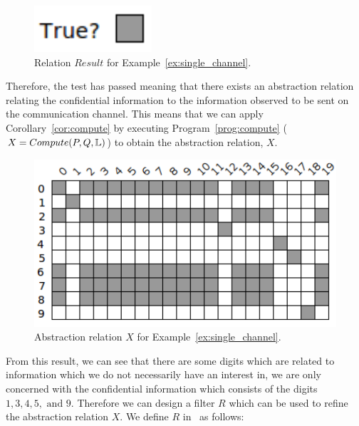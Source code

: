 \begin{example}
	\begin{figure}[ht]
		\centering
		\includegraphics[scale=0.65]{Figures/PDF/Relview/True.pdf}
		\caption{Relation $Result$ for Example~\ref{ex:single_channel}.}
		\label{fig:single_channel_result}
	\end{figure}

	Therefore, the test has passed meaning that there exists an abstraction relation relating the confidential information to the information observed to be sent on the communication channel. This means that we can apply Corollary~\ref{cor:compute} by executing Program~\ref{prog:compute} ($X = Compute(P,Q,\mathbb{L})$) to obtain the abstraction relation, $X$. \newline

	\begin{figure}[ht]
		\centering
		\includegraphics[scale=0.65]{Figures/PDF/Relview/X.pdf}
		\caption{Abstraction relation $X$ for Example~\ref{ex:single_channel}.}
		\label{fig:single_channel_x}
	\end{figure}

	From this result, we can see that there are some digits which are related to information which we do not necessarily have an interest in, \ie we are only concerned with the confidential information which consists of the digits $1,3,4,5, \text{ and } 9$. Therefore we can design a filter $R$ which can be used to refine the abstraction relation $X$. We define $R$ in \relview\ as follows: \newline
	

\end{example}
